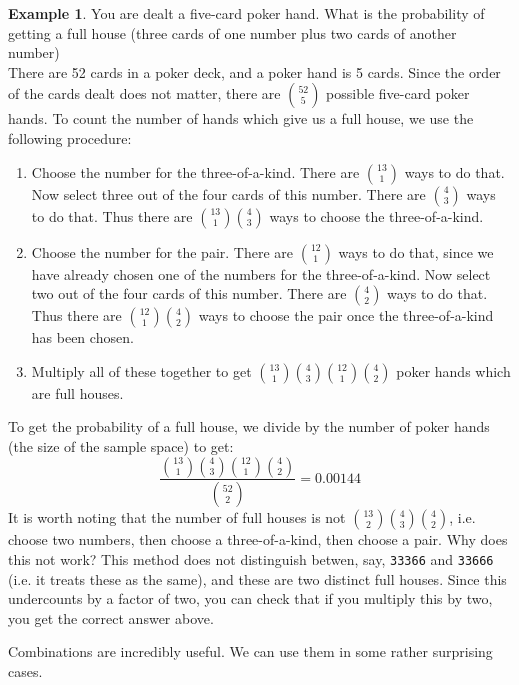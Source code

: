 \documentclass[12pt]{article}
\theoremstyle{definition}
\newtheorem*{example}{Example}
\theoremstyle{remark}
\begin{document}
\begin{example}
You are dealt a five-card poker hand. What is the probability of getting a full house (three cards of one number plus two cards of another number)\\

There are 52 cards in a poker deck, and a poker hand is 5 cards. Since the order of the cards dealt does not matter, there are $\binom{52}{5}$ possible five-card poker hands. To count the number of hands which give us a full house, we use the following procedure:
\begin{enumerate}
\item Choose the number for the three-of-a-kind. There are $\binom{13}{1}$ ways to do that. Now select three out of the four cards of this number. There are $\binom{4}{3}$ ways to do that. Thus there are $\binom{13}{1}\binom{4}{3}$ ways to choose the three-of-a-kind.
\item Choose the number for the pair. There are $\binom{12}{1}$ ways to do that, since we have already chosen one of the numbers for the three-of-a-kind. Now select two out of the four cards of this number. There are $\binom{4}{2}$ ways to do that. Thus there are $\binom{12}{1}\binom{4}{2}$ ways to choose the pair once the three-of-a-kind has been chosen.
\item Multiply all of these together to get $\binom{13}{1}\binom{4}{3}\binom{12}{1}\binom{4}{2}$ poker hands which are full houses.
\end{enumerate}
To get the probability of a full house, we divide by the number of poker hands (the size of the sample space) to get:
\[
\frac{\binom{13}{1}\binom{4}{3}\binom{12}{1}\binom{4}{2}}{\binom{52}{2}} = 0.00144
\]
It is worth noting that the number of full houses is not $\binom{13}{2}\binom{4}{3}\binom{4}{2}$, i.e. choose two numbers, then choose a three-of-a-kind, then choose a pair. Why does this not work? This method does not distinguish betwen, say, \texttt{33366} and \texttt{33666} (i.e. it treats these as the same), and these are two distinct full houses. Since this undercounts by a factor of two, you can check that if you multiply this by two, you get the correct answer above. 
\end{example}

Combinations are incredibly useful. We can use them in some rather surprising cases.
\end{document}
